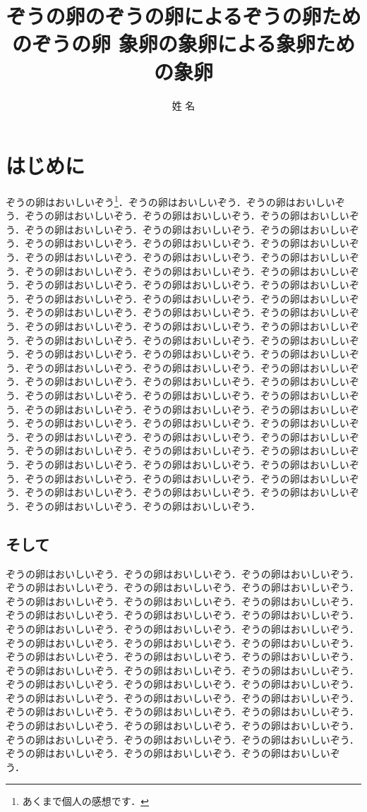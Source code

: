 \documentclass[
	10pt,
	a4j,		%
	twocolumn,	%
	uplatex
]{jsarticle}
\title{ぞうの卵のぞうの卵によるぞうの卵ためのぞうの卵 \linebreak 象卵の象卵による象卵ための象卵}
\author{姓 名}
\begin{document}
\maketitle

\section{はじめに}
ぞうの卵はおいしいぞう\footnote{あくまで個人の感想です．}．ぞうの卵はおいしいぞう．ぞうの卵はおいしいぞう．ぞうの卵はおいしいぞう．ぞうの卵はおいしいぞう．ぞうの卵はおいしいぞう．ぞうの卵はおいしいぞう．ぞうの卵はおいしいぞう．ぞうの卵はおいしいぞう．ぞうの卵はおいしいぞう．ぞうの卵はおいしいぞう．ぞうの卵はおいしいぞう．ぞうの卵はおいしいぞう．ぞうの卵はおいしいぞう．ぞうの卵はおいしいぞう．ぞうの卵はおいしいぞう．ぞうの卵はおいしいぞう．ぞうの卵はおいしいぞう．ぞうの卵はおいしいぞう．ぞうの卵はおいしいぞう．ぞうの卵はおいしいぞう．ぞうの卵はおいしいぞう．ぞうの卵はおいしいぞう．ぞうの卵はおいしいぞう．ぞうの卵はおいしいぞう．ぞうの卵はおいしいぞう．ぞうの卵はおいしいぞう．ぞうの卵はおいしいぞう．ぞうの卵はおいしいぞう．ぞうの卵はおいしいぞう．ぞうの卵はおいしいぞう．ぞうの卵はおいしいぞう．ぞうの卵はおいしいぞう．ぞうの卵はおいしいぞう．ぞうの卵はおいしいぞう．ぞうの卵はおいしいぞう．ぞうの卵はおいしいぞう．ぞうの卵はおいしいぞう．ぞうの卵はおいしいぞう．ぞうの卵はおいしいぞう．ぞうの卵はおいしいぞう．ぞうの卵はおいしいぞう．ぞうの卵はおいしいぞう．ぞうの卵はおいしいぞう．ぞうの卵はおいしいぞう．ぞうの卵はおいしいぞう．ぞうの卵はおいしいぞう．ぞうの卵はおいしいぞう．ぞうの卵はおいしいぞう．ぞうの卵はおいしいぞう．ぞうの卵はおいしいぞう．ぞうの卵はおいしいぞう．ぞうの卵はおいしいぞう．ぞうの卵はおいしいぞう．ぞうの卵はおいしいぞう．ぞうの卵はおいしいぞう．ぞうの卵はおいしいぞう．ぞうの卵はおいしいぞう．ぞうの卵はおいしいぞう．ぞうの卵はおいしいぞう．ぞうの卵はおいしいぞう．ぞうの卵はおいしいぞう．ぞうの卵はおいしいぞう．ぞうの卵はおいしいぞう．ぞうの卵はおいしいぞう．ぞうの卵はおいしいぞう．ぞうの卵はおいしいぞう．ぞうの卵はおいしいぞう．

\subsection{そして}
ぞうの卵はおいしいぞう．ぞうの卵はおいしいぞう．ぞうの卵はおいしいぞう．ぞうの卵はおいしいぞう．ぞうの卵はおいしいぞう．ぞうの卵はおいしいぞう．ぞうの卵はおいしいぞう．ぞうの卵はおいしいぞう．ぞうの卵はおいしいぞう．ぞうの卵はおいしいぞう．ぞうの卵はおいしいぞう．ぞうの卵はおいしいぞう．ぞうの卵はおいしいぞう．ぞうの卵はおいしいぞう．ぞうの卵はおいしいぞう．ぞうの卵はおいしいぞう．ぞうの卵はおいしいぞう．ぞうの卵はおいしいぞう．ぞうの卵はおいしいぞう．ぞうの卵はおいしいぞう．ぞうの卵はおいしいぞう．ぞうの卵はおいしいぞう．ぞうの卵はおいしいぞう．ぞうの卵はおいしいぞう．ぞうの卵はおいしいぞう．ぞうの卵はおいしいぞう．ぞうの卵はおいしいぞう．ぞうの卵はおいしいぞう．ぞうの卵はおいしいぞう．ぞうの卵はおいしいぞう．ぞうの卵はおいしいぞう．ぞうの卵はおいしいぞう．ぞうの卵はおいしいぞう．ぞうの卵はおいしいぞう．ぞうの卵はおいしいぞう．ぞうの卵はおいしいぞう．ぞうの卵はおいしいぞう．ぞうの卵はおいしいぞう．ぞうの卵はおいしいぞう．ぞうの卵はおいしいぞう．ぞうの卵はおいしいぞう．ぞうの卵はおいしいぞう．~\cite{110001167075,120002205324,mr1763essay,fisher1925statistical}
\end{document}
